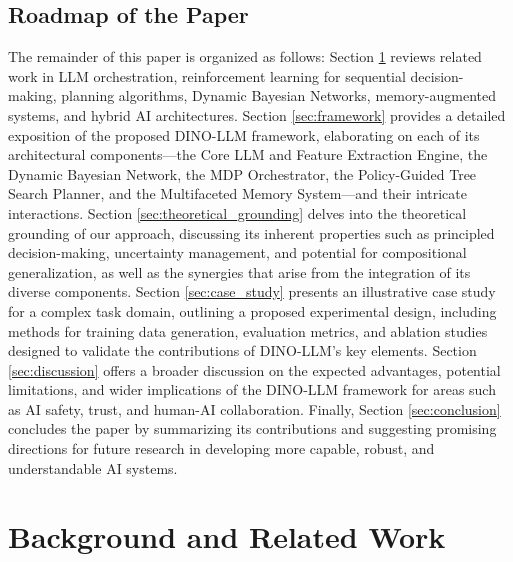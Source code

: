 \documentclass[11pt]{article}
\begin{document}
\subsection{Roadmap of the Paper}
\label{sec:intro_roadmap}
The remainder of this paper is organized as follows: Section \ref{sec:related_work} reviews related work in LLM orchestration, reinforcement learning for sequential decision-making, planning algorithms, Dynamic Bayesian Networks, memory-augmented systems, and hybrid AI architectures. Section \ref{sec:framework} provides a detailed exposition of the proposed DINO-LLM framework, elaborating on each of its architectural components—the Core LLM and Feature Extraction Engine, the Dynamic Bayesian Network, the MDP Orchestrator, the Policy-Guided Tree Search Planner, and the Multifaceted Memory System—and their intricate interactions. Section \ref{sec:theoretical_grounding} delves into the theoretical grounding of our approach, discussing its inherent properties such as principled decision-making, uncertainty management, and potential for compositional generalization, as well as the synergies that arise from the integration of its diverse components. Section \ref{sec:case_study} presents an illustrative case study for a complex task domain, outlining a proposed experimental design, including methods for training data generation, evaluation metrics, and ablation studies designed to validate the contributions of DINO-LLM's key elements. Section \ref{sec:discussion} offers a broader discussion on the expected advantages, potential limitations, and wider implications of the DINO-LLM framework for areas such as AI safety, trust, and human-AI collaboration. Finally, Section \ref{sec:conclusion} concludes the paper by summarizing its contributions and suggesting promising directions for future research in developing more capable, robust, and understandable AI systems.

\section{Background and Related Work}
\label{sec:related_work}
\end{document}
